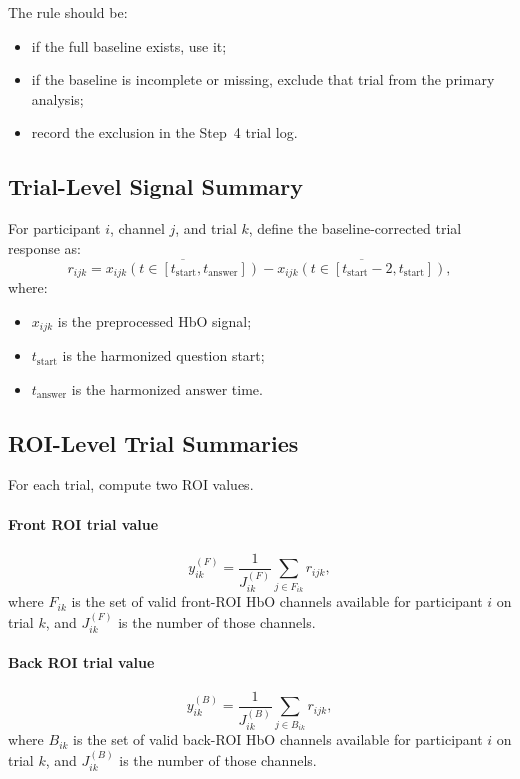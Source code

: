 \documentclass[11pt]{article}
\begin{document}
The rule should be:
\begin{itemize}
    \item if the full baseline exists, use it;
    \item if the baseline is incomplete or missing, exclude that trial from the primary analysis;
    \item record the exclusion in the Step~4 trial log.
\end{itemize}

\subsection{Trial-Level Signal Summary}
For participant \(i\), channel \(j\), and trial \(k\), define the baseline-corrected trial response as:
\begin{equation}
r_{ijk}
=
\overline{x_{ijk}(t \in [t_{\mathrm{start}}, t_{\mathrm{answer}}])}
-
\overline{x_{ijk}(t \in [t_{\mathrm{start}}-2, t_{\mathrm{start}}])},
\end{equation}
where:
\begin{itemize}
    \item \(x_{ijk}\) is the preprocessed HbO signal;
    \item \(t_{\mathrm{start}}\) is the harmonized question start;
    \item \(t_{\mathrm{answer}}\) is the harmonized answer time.
\end{itemize}

\subsection{ROI-Level Trial Summaries}
For each trial, compute two ROI values.

\paragraph{Front ROI trial value}
\begin{equation}
y^{(F)}_{ik}
=
\frac{1}{J^{(F)}_{ik}}
\sum_{j \in F_{ik}} r_{ijk},
\end{equation}
where \(F_{ik}\) is the set of valid front-ROI HbO channels available for participant \(i\) on trial \(k\),
and \(J^{(F)}_{ik}\) is the number of those channels.

\paragraph{Back ROI trial value}
\begin{equation}
y^{(B)}_{ik}
=
\frac{1}{J^{(B)}_{ik}}
\sum_{j \in B_{ik}} r_{ijk},
\end{equation}
where \(B_{ik}\) is the set of valid back-ROI HbO channels available for participant \(i\) on trial \(k\),
and \(J^{(B)}_{ik}\) is the number of those channels.
\end{document}
